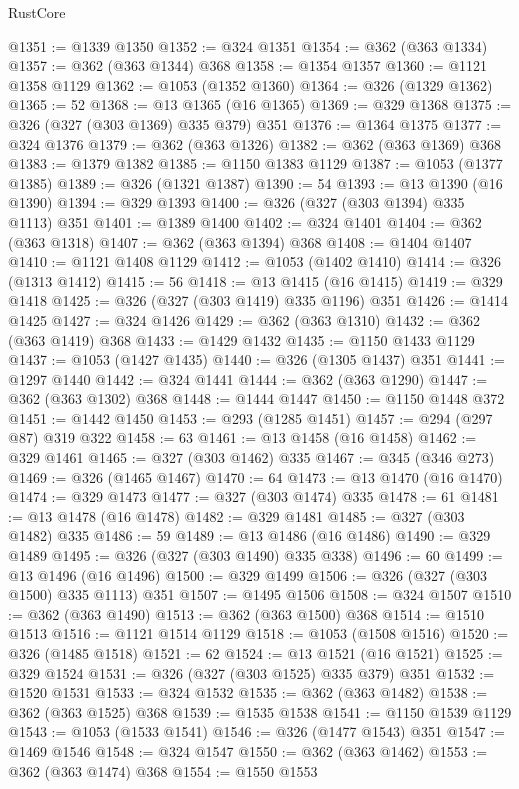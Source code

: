 \begin{lexlean}{RustCore}
\begin{coremodule}
@1351 := @1339 @1350
@1352 := @324 @1351
@1354 := @362 (@363 @1334)
@1357 := @362 (@363 @1344) @368
@1358 := @1354 @1357
@1360 := @1121 @1358 @1129
@1362 := @1053 (@1352 @1360)
@1364 := @326 (@1329 @1362)
@1365 := 52
@1368 := @13 @1365 (@16 @1365)
@1369 := @329 @1368
@1375 := @326 (@327 (@303 @1369) @335 @379) @351
@1376 := @1364 @1375
@1377 := @324 @1376
@1379 := @362 (@363 @1326)
@1382 := @362 (@363 @1369) @368
@1383 := @1379 @1382
@1385 := @1150 @1383 @1129
@1387 := @1053 (@1377 @1385)
@1389 := @326 (@1321 @1387)
@1390 := 54
@1393 := @13 @1390 (@16 @1390)
@1394 := @329 @1393
@1400 := @326 (@327 (@303 @1394) @335 @1113) @351
@1401 := @1389 @1400
@1402 := @324 @1401
@1404 := @362 (@363 @1318)
@1407 := @362 (@363 @1394) @368
@1408 := @1404 @1407
@1410 := @1121 @1408 @1129
@1412 := @1053 (@1402 @1410)
@1414 := @326 (@1313 @1412)
@1415 := 56
@1418 := @13 @1415 (@16 @1415)
@1419 := @329 @1418
@1425 := @326 (@327 (@303 @1419) @335 @1196) @351
@1426 := @1414 @1425
@1427 := @324 @1426
@1429 := @362 (@363 @1310)
@1432 := @362 (@363 @1419) @368
@1433 := @1429 @1432
@1435 := @1150 @1433 @1129
@1437 := @1053 (@1427 @1435)
@1440 := @326 (@1305 @1437) @351
@1441 := @1297 @1440
@1442 := @324 @1441
@1444 := @362 (@363 @1290)
@1447 := @362 (@363 @1302) @368
@1448 := @1444 @1447
@1450 := @1150 @1448 @372
@1451 := @1442 @1450
@1453 := @293 (@1285 @1451)
@1457 := @294 (@297 @87) @319 @322
@1458 := 63
@1461 := @13 @1458 (@16 @1458)
@1462 := @329 @1461
@1465 := @327 (@303 @1462) @335
@1467 := @345 (@346 @273)
@1469 := @326 (@1465 @1467)
@1470 := 64
@1473 := @13 @1470 (@16 @1470)
@1474 := @329 @1473
@1477 := @327 (@303 @1474) @335
@1478 := 61
@1481 := @13 @1478 (@16 @1478)
@1482 := @329 @1481
@1485 := @327 (@303 @1482) @335
@1486 := 59
@1489 := @13 @1486 (@16 @1486)
@1490 := @329 @1489
@1495 := @326 (@327 (@303 @1490) @335 @338)
@1496 := 60
@1499 := @13 @1496 (@16 @1496)
@1500 := @329 @1499
@1506 := @326 (@327 (@303 @1500) @335 @1113) @351
@1507 := @1495 @1506
@1508 := @324 @1507
@1510 := @362 (@363 @1490)
@1513 := @362 (@363 @1500) @368
@1514 := @1510 @1513
@1516 := @1121 @1514 @1129
@1518 := @1053 (@1508 @1516)
@1520 := @326 (@1485 @1518)
@1521 := 62
@1524 := @13 @1521 (@16 @1521)
@1525 := @329 @1524
@1531 := @326 (@327 (@303 @1525) @335 @379) @351
@1532 := @1520 @1531
@1533 := @324 @1532
@1535 := @362 (@363 @1482)
@1538 := @362 (@363 @1525) @368
@1539 := @1535 @1538
@1541 := @1150 @1539 @1129
@1543 := @1053 (@1533 @1541)
@1546 := @326 (@1477 @1543) @351
@1547 := @1469 @1546
@1548 := @324 @1547
@1550 := @362 (@363 @1462)
@1553 := @362 (@363 @1474) @368
@1554 := @1550 @1553

\end{coremodule}
\end{lexlean}
